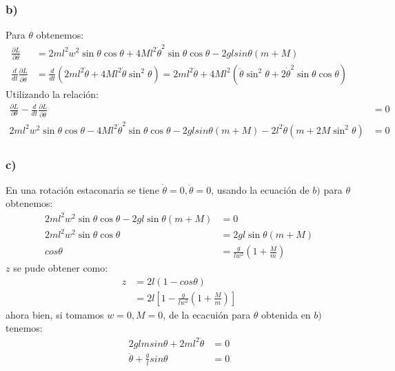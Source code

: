 \documentclass{article}
\begin{document}
\begin{tcolorbox}[breakable]
    \subsubsection*{b)}
    Para $\theta$ obtenemos:
    \begin{align*}    
        \frac{\partial L}{\partial \theta} 
        &=2ml^2w^2\sin\theta \cos\theta 
        + 4Ml^2\dot{\theta}^2\sin\theta \cos\theta 
        -2glsin\theta(m+M) \\
        \frac{d}{dt}\frac{\partial L}{\partial \dot{\theta}} 
        &= \frac{d}{dt}(2ml^2\dot{\theta} + 4Ml^2\dot{\theta}\sin^2\theta) 
        = 2ml^2\ddot{\theta} + 4Ml^2(\ddot{\theta}\sin^2\theta + 2\dot{\theta}^2\sin\theta \cos\theta)
    \end{align*}
    Utilizando la relación:
    \begin{align*}
        \frac{\partial L}{\partial \theta} - \frac{d}{dt}\frac{\partial L}{\partial \dot{\theta}} &= 0 \\
        2ml^2w^2\sin\theta \cos\theta 
        -4Ml^2\dot{\theta}^2\sin\theta \cos\theta 
        -2glsin\theta(m+M) 
        -2l^2\ddot{\theta}(m + 2M\sin^2\theta)  
        &= 0
    \end{align*}
    \subsubsection*{c)}
    En una rotación estaconaria se tiene $\dot{\theta} = 0, \ddot{\theta} = 0$, usando la ecuación de $b)$ para $\theta$ obtenemos:
    \begin{align*}
        2ml^2w^2\sin\theta \cos\theta 
        -2gl\sin\theta(m+M)   
        &= 0 \\
        2ml^2w^2\sin\theta \cos\theta
        &= 2gl\sin\theta(m+M) \\
        cos\theta &= \tfrac{g}{lw^2}(1+\tfrac{M}{m})
    \end{align*} 
    $z$ se pude obtener como:
    \begin{align*}
        z 
        &= 2l(1-cos\theta) \\
        &= 2l[1-\tfrac{g}{lw^2}(1+\tfrac{M}{m})]
    \end{align*}
    ahora bien, si tomamos $w=0,M=0$, de la ecacuión para $\theta$ obtenida en $b)$ tenemos:
    \begin{align*}
        2glmsin\theta 
        +2ml^2\ddot{\theta}  
        &= 0 \\
        \ddot{\theta} + \frac{g}{l}sin\theta &= 0
    \end{align*} 

\end{tcolorbox}
\end{document}
